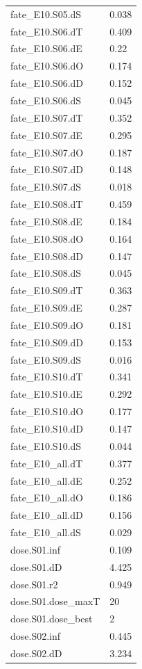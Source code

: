 {\begin{longtable}{p{}p{}}
{}fate\_E10.S05.dS & 0.038\\
{}fate\_E10.S06.dT & 0.409\\
{}fate\_E10.S06.dE & 0.22\\
{}fate\_E10.S06.dO & 0.174\\
{}fate\_E10.S06.dD & 0.152\\
{}fate\_E10.S06.dS & 0.045\\
{}fate\_E10.S07.dT & 0.352\\
{}fate\_E10.S07.dE & 0.295\\
{}fate\_E10.S07.dO & 0.187\\
{}fate\_E10.S07.dD & 0.148\\
{}fate\_E10.S07.dS & 0.018\\
{}fate\_E10.S08.dT & 0.459\\
{}fate\_E10.S08.dE & 0.184\\
{}fate\_E10.S08.dO & 0.164\\
{}fate\_E10.S08.dD & 0.147\\
{}fate\_E10.S08.dS & 0.045\\
{}fate\_E10.S09.dT & 0.363\\
{}fate\_E10.S09.dE & 0.287\\
{}fate\_E10.S09.dO & 0.181\\
{}fate\_E10.S09.dD & 0.153\\
{}fate\_E10.S09.dS & 0.016\\
{}fate\_E10.S10.dT & 0.341\\
{}fate\_E10.S10.dE & 0.292\\
{}fate\_E10.S10.dO & 0.177\\
{}fate\_E10.S10.dD & 0.147\\
{}fate\_E10.S10.dS & 0.044\\
{}fate\_E10\_all.dT & 0.377\\
{}fate\_E10\_all.dE & 0.252\\
{}fate\_E10\_all.dO & 0.186\\
{}fate\_E10\_all.dD & 0.156\\
{}fate\_E10\_all.dS & 0.029\\
{}dose.S01.inf & 0.109\\
{}dose.S01.dD & 4.425\\
{}dose.S01.r2 & 0.949\\
{}dose.S01.dose\_maxT & 20\\
{}dose.S01.dose\_best & 2\\
{}dose.S02.inf & 0.445\\
{}dose.S02.dD & 3.234\\

\end{longtable}}
